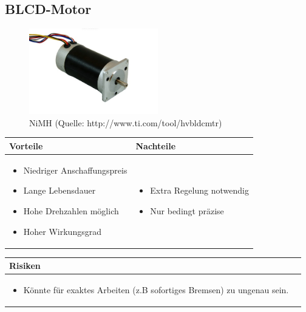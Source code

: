 \pagebreak

\subsection{BLCD-Motor}

\begin{figure}[h!]%
\centering
\includegraphics[width=0.5\textwidth]{fig/blcd.jpg}
\caption{NiMH (Quelle: http://www.ti.com/tool/hvbldcmtr)}
\label{fig:Java}
\end{figure}

\begin{table}[h]
\begin{tabular}{p{} | p{}}


 \textbf{Vorteile} & \textbf{Nachteile} \\ \hline
	 
\begin{itemize}
\item Niedriger Anschaffungspreis
\item Lange Lebensdauer
\item Hohe Drehzahlen möglich
\item Hoher Wirkungsgrad
\end{itemize}

 
 &
 
\begin{itemize}
\item Extra Regelung notwendig
\item Nur bedingt präzise
\end{itemize}

\end{tabular}
\end{table}

\begin{table}[h]
\begin{tabular}{p{}p{}}


 \textbf{Risiken} & \\ \hline
	 
\begin{itemize}
\item Könnte für exaktes Arbeiten (z.B sofortiges Bremsen) zu ungenau sein.
\end{itemize}

 
\end{tabular}
\end{table}

\pagebreak
